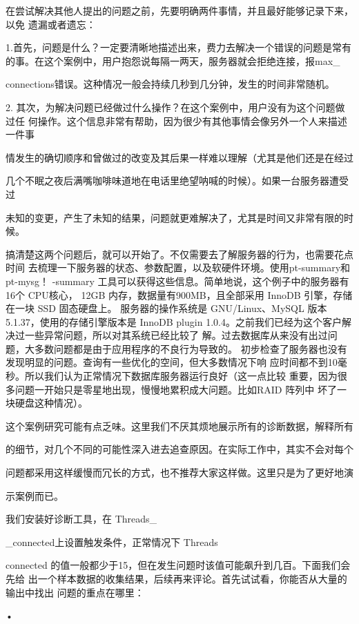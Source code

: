 {在尝试解决其他人提出的问题之前，先要明确两件事情，并且最好能够记录下来，以免
遗漏或者遗忘：

1.首先，问题是什么？一定要清晰地描述出来，费力去解决一个错误的问题是常有
的事。在这个案例中，用户抱怨说每隔一两天，服务器就会拒绝连接，报max\_

connections错误。这种情况一般会持续几秒到几分钟，发生的时间非常随机。

2. 其次，为解决问题已经做过什么操作？在这个案例中，用户没有为这个问题做过任
何操作。这个信息非常有帮助，因为很少有其他事情会像另外一个人来描述一件事

情发生的确切顺序和曾做过的改变及其后果一样难以理解（尤其是他们还是在经过

几个不眠之夜后满嘴咖啡味道地在电话里绝望呐喊的时候）。如果一台服务器遭受过

未知的变更，产生了未知的结果，问题就更难解决了，尤其是时间又非常有限的时候。

搞清楚这两个问题后，就可以开始了。不仅需要去了解服务器的行为，也需要花点时间
去梳理一下服务器的状态、参数配置，以及软硬件环境。使用pt-summary和pt-mysg！
-summary 工具可以获得这些信息。简单地说，这个例子中的服务器有16个 CPU核心，
12GB 内存，数据量有900MB，且全部采用 InnoDB 引擎，存储在一块 SSD 固态硬盘上。
服务器的操作系统是 GNU/Linux、MySQL 版本5.1.37，使用的存储引擎版本是 InnoDB
plugin 1.0.4。之前我们已经为这个客户解决过一些异常问题，所以对其系统已经比较了
解。过去数据库从来没有出过问题，大多数问题都是由于应用程序的不良行为导致的。
初步检查了服务器也没有发现明显的问题。查询有一些优化的空间，但大多数情况下响
应时间都不到10毫秒。所以我们认为正常情况下数据库服务器运行良好（这一点比较
重要，因为很多问题一开始只是零星地出现，慢慢地累积成大问题。比如RAID 阵列中
坏了一块硬盘这种情况）。

这个案例研究可能有点乏味。这里我们不厌其烦地展示所有的诊断数据，解释所有

的细节，对几个不同的可能性深入进去追查原因。在实际工作中，其实不会对每个

问题都采用这样缓慢而冗长的方式，也不推荐大家这样做。这里只是为了更好地演

示案例而已。

我们安装好诊断工具，在 Threads\_

\_connected上设置触发条件，正常情况下 Threads

connected 的值一般都少于15，但在发生问题时该值可能飙升到几百。下面我们会先给
出一个样本数据的收集结果，后续再来评论。首先试试看，你能否从大量的输出中找出
问题的重点在哪里：

•

}
